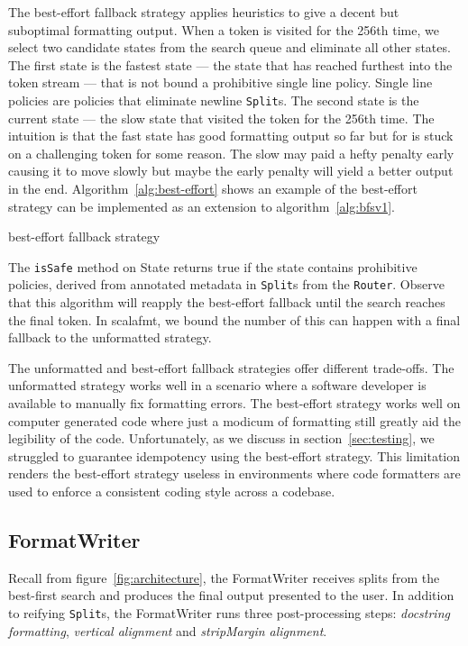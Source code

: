 The best-effort fallback strategy applies heuristics to give a decent but suboptimal formatting output.
When a token is visited for the 256th time, we select two candidate states from the search queue and eliminate all other states.
The first state is the fastest state --- the state that has reached furthest into the token stream --- that is not bound a prohibitive single line policy.
Single line policies are policies that eliminate newline \texttt{Split}s.
The second state is the current state --- the slow state that visited the token for the 256th time.
The intuition is that the fast state has good formatting output so far but for is stuck on a challenging token for some reason.
The slow may paid a hefty penalty early causing it to move slowly but maybe the early penalty will yield a better output in the end.
Algorithm~\ref{alg:best-effort} shows an example of the best-effort strategy can be implemented as an extension to algorithm~\ref{alg:bfsv1}.
\begin{algorithm}
  \caption{best-effort fallback strategy}\label{alg:best-effort}
  
\end{algorithm}
The \texttt{isSafe} method on State returns true if the state contains prohibitive policies, derived from annotated metadata in \texttt{Split}s from the \texttt{Router}.
Observe that this algorithm will reapply the best-effort fallback until the search reaches the final token.
In scalafmt, we bound the number of this can happen with a final fallback to the unformatted strategy.

The unformatted and best-effort fallback strategies offer different trade-offs.
The unformatted strategy works well in a scenario where a software developer is available to manually fix formatting errors.
The best-effort strategy works well on computer generated code where just a modicum of formatting still greatly aid the legibility of the code.
Unfortunately, as we discuss in section~\ref{sec:testing}, we struggled to guarantee idempotency using the best-effort strategy.
This limitation renders the best-effort strategy useless in environments where code formatters are used to enforce a consistent coding style across a codebase.


\subsection{FormatWriter}
Recall from figure~\ref{fig:architecture}, the FormatWriter receives splits from the best-first search and produces the final output presented to the user.
In addition to reifying \texttt{Split}s, the FormatWriter runs three post-processing steps: \emph{docstring formatting}, \emph{vertical alignment} and \emph{stripMargin alignment}.

